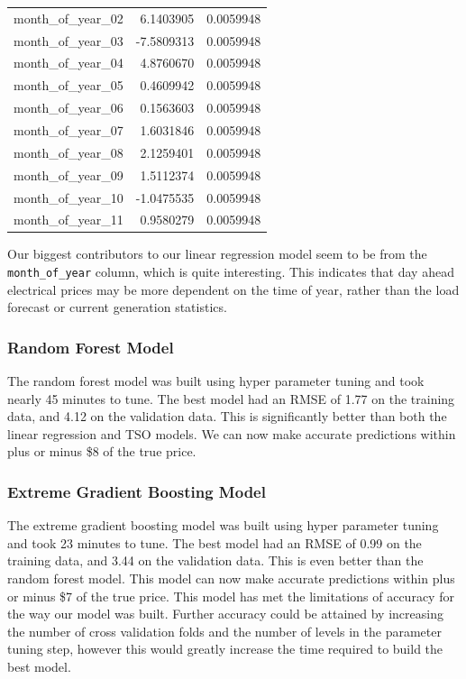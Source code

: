 \documentclass[
]{article}
\begin{document}
\begin{longtable*}[t]{lrr}
month\_of\_year\_02 & 6.1403905 & 0.0059948\\
month\_of\_year\_03 & -7.5809313 & 0.0059948\\
month\_of\_year\_04 & 4.8760670 & 0.0059948\\
month\_of\_year\_05 & 0.4609942 & 0.0059948\\
\addlinespace
month\_of\_year\_06 & 0.1563603 & 0.0059948\\
month\_of\_year\_07 & 1.6031846 & 0.0059948\\
month\_of\_year\_08 & 2.1259401 & 0.0059948\\
month\_of\_year\_09 & 1.5112374 & 0.0059948\\
month\_of\_year\_10 & -1.0475535 & 0.0059948\\
\addlinespace
month\_of\_year\_11 & 0.9580279 & 0.0059948\\
\bottomrule
\end{longtable*}

Our biggest contributors to our linear regression model seem to be from
the \texttt{month\_of\_year} column, which is quite interesting. This
indicates that day ahead electrical prices may be more dependent on the
time of year, rather than the load forecast or current generation
statistics.

\subsubsection{Random Forest Model}\label{random-forest-model-1}

The random forest model was built using hyper parameter tuning and took
nearly 45 minutes to tune. The best model had an RMSE of 1.77 on the
training data, and 4.12 on the validation data. This is significantly
better than both the linear regression and TSO models. We can now make
accurate predictions within plus or minus \$8 of the true price.

\subsubsection{Extreme Gradient Boosting
Model}\label{extreme-gradient-boosting-model-1}

The extreme gradient boosting model was built using hyper parameter
tuning and took 23 minutes to tune. The best model had an RMSE of 0.99
on the training data, and 3.44 on the validation data. This is even
better than the random forest model. This model can now make accurate
predictions within plus or minus \$7 of the true price. This model has
met the limitations of accuracy for the way our model was built. Further
accuracy could be attained by increasing the number of cross validation
folds and the number of levels in the parameter tuning step, however
this would greatly increase the time required to build the best model.
\end{document}
